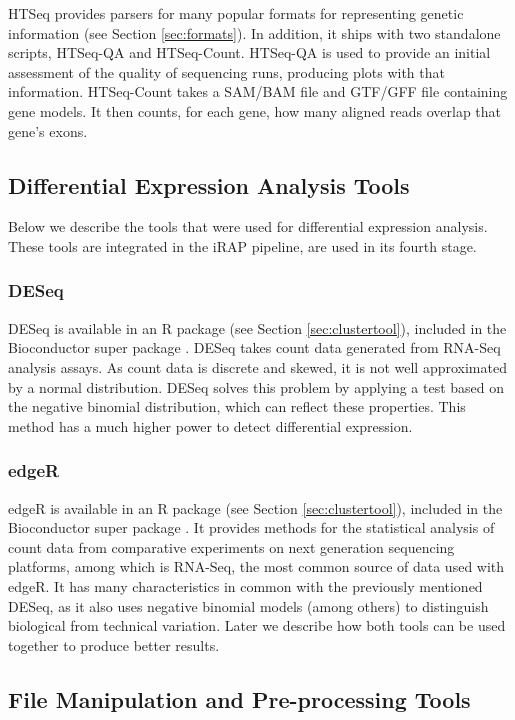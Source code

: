 HTSeq provides parsers for many popular formats for representing genetic
information (see Section \ref{sec:formats}). In addition, it ships with two
standalone scripts, HTSeq-QA and HTSeq-Count. HTSeq-QA is used to provide an
initial assessment of the quality of sequencing runs, producing plots with that
information. HTSeq-Count takes a SAM/BAM file and GTF/GFF file containing gene
models. It then counts, for each gene, how many aligned reads overlap that
gene's exons.

\subsection{Differential Expression Analysis Tools}

Below we describe the tools that were used for differential expression analysis.
These tools are integrated in the iRAP pipeline, are used in its fourth stage.

\subsubsection*{DESeq}

DESeq is available in an R package (see Section \ref{sec:clustertool}), included
in the Bioconductor super package \cite{20979621}. DESeq takes count data
generated from RNA-Seq analysis assays. As count data is discrete and skewed, it
is not well approximated by a normal distribution. DESeq solves this problem by
applying a test based on the negative binomial distribution, which can reflect
these properties. This method has a much higher power to detect differential
expression.

\subsubsection*{edgeR}

edgeR is available in an R package (see Section \ref{sec:clustertool}), included
in the Bioconductor super package \cite{robinson2010edger}. It provides methods
for the statistical analysis of count data from comparative experiments on next
generation sequencing platforms, among which is RNA-Seq, the most common source
of data used with edgeR. It has many characteristics in common with the
previously mentioned DESeq, as it also uses negative binomial models (among
others) to distinguish biological from technical variation. Later we describe
how both tools can be used together to produce better results.

\subsection{File Manipulation and Pre-processing Tools}

